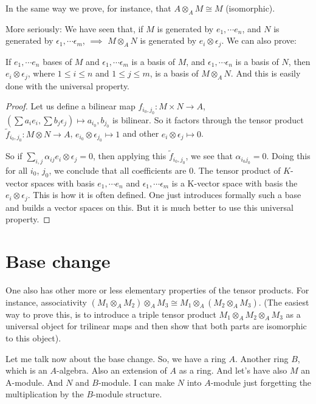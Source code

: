 In the same way we prove, for instance, that $A \otimes_A M \cong M$ (isomorphic).

More seriously: We have seen that, if $M$ is generated by $e_1, \cdots e_n$, and $N$ is generated by $\epsilon_1, \cdots \epsilon_m$, $\implies$ $M\otimes_A N$ is generated by  $e_i\otimes\epsilon_j$.
We can also prove: 

\begin{proposition}
If $e_1, \cdots e_n$ bases of $M$ and $\epsilon_1, \cdots \epsilon_m$ is a basis of $M$, and $\epsilon_1, \cdots \epsilon_n$ is a basis of $N$, then $e_i\otimes \epsilon_j$, where $1 \leq i\leq n$ and $1 \leq j\leq m$, is a basis of $M \otimes_A N$. And this is easily done with the universal property. 
\end{proposition}

\begin{proof}
Let us define a bilinear map $f_{i_0,j_0}:M \times N \to A$, $\left(\sum a_ie_i,\sum b_j\epsilon_j\right)\mapsto a_{i_0}, b_{j_0}$ is bilinear. So it factors through the tensor product $\widetilde{f}_{i_0,j_0}:M\otimes N\to A$, $e_{i_0}\otimes\epsilon_{j_0}\mapsto 1$ and other $e_i\otimes\epsilon_j\mapsto 0$.

So if $\sum_{i,j}\alpha_{ij} e_i\otimes\epsilon_j =0$, then applying this $\widetilde{f}_{i_0,j_0}$, we see that $\alpha_{i_0j_0}= 0$. Doing this for all $i_0$, $j_0$, we conclude that all coefficients are $0$. The tensor product of $K$-vector spaces with basis $e_1, \cdots e_n$ and $\epsilon_1, \cdots \epsilon_m$ is a K-vector space with basis the $e_i\otimes \epsilon_j$. This is how it is often defined. One just introduces formally such a base and builds a vector spaces on this. But it is much better to use this universal property.
\end{proof}

\section{Base change}

One also has other more or less elementary properties of the tensor products. For instance, associativity $(M_1 \otimes_A M_2) \otimes_A M_3\cong M_1 \otimes_A (M_2 \otimes_A M_3)$.  (The easiest way to prove this, is to introduce a triple tensor product $M_1\otimes_A M_2\otimes_A M_3$ as a universal object for trilinear maps and then show that both parts are isomorphic to this object).

Let me talk now about the base change. So, we have a ring $A$. Another ring $B$, which is an $A$-algebra. Also an extension of $A$ as a ring. And let's have also $M$ an A-module. And $N$ and $B$-module. I can make $N$ into $A$-module just forgetting the multiplication by the $B$-module structure. 

